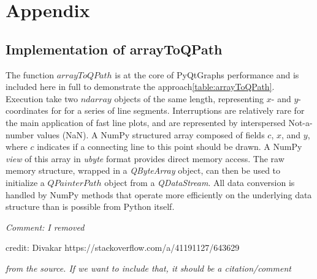\documentclass[journal]{vgtc}                %
\begin{document}

%

%
%
%

\section{Appendix}
\subsection{Implementation of arrayToQPath}
\label{app_arrayToQPath}
The function $arrayToQPath$ is at the core of PyQtGraphs performance and is included here in full to demonstrate the approach\ref{table:arrayToQPath}. 
Execution take two $ndarray$ objects of the same length, representing $x$- and $y$-coordinates for for a series of line segments. Interruptions are relatively rare for the main application of fast line plots, and are represented by interspersed Not-a-number values (NaN). A NumPy structured array composed of fields $c$, $x$, and $y$, where $c$ indicates if a connecting line to this point should be drawn. A NumPy \emph{view} of this array in \emph{ubyte} format provides direct memory access. The raw memory structure, wrapped in a \emph{QByteArray} object, can then be used to initialize a $QPainterPath$ object from a \emph{QDataStream}. All data conversion is handled by NumPy methods that operate more efficiently on the underlying data structure than is possible from Python itself.

\emph{Comment: I removed}

credit: Divakar https://stackoverflow.com/a/41191127/643629

\emph{from the source. If we want to include that, it should be a citation/comment}
\end{document}

